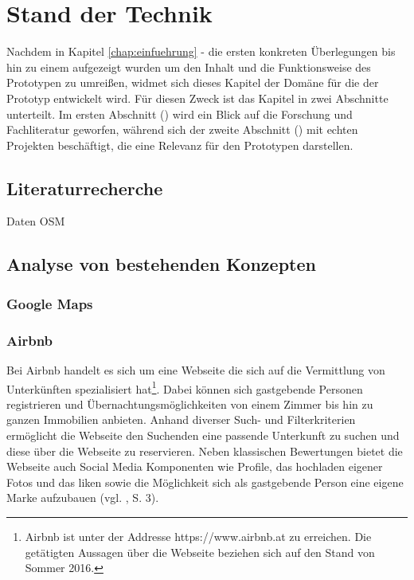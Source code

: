 \documentclass[../Bachelorarbeit.tex]{subfiles}
\begin{document}
\chapter{Stand der Technik}
\label{chap:analyse}

Nachdem in Kapitel \ref{chap:einfuehrung} -  die ersten konkreten Überlegungen bis hin zu einem  aufgezeigt wurden um den Inhalt und die Funktionsweise des Prototypen zu umreißen, widmet sich dieses Kapitel der Domäne für die der Prototyp entwickelt wird.
Für diesen Zweck ist das Kapitel in zwei Abschnitte unterteilt. 
Im ersten Abschnitt () wird ein Blick auf die Forschung und Fachliteratur geworfen, während sich der zweite Abschnitt () mit echten Projekten beschäftigt, die eine Relevanz für den Prototypen darstellen.


\section{Literaturrecherche}
\label{chap:analyse:sec:sota}





Daten OSM


\section{Analyse von bestehenden Konzepten}
\label{chap:analyse:sec:analyBestehendeKonz}


\subsection{Google Maps}
\label{chap:analyse:sec:sota:sec:google_maps}


\subsection{Airbnb}
Bei Airbnb handelt es sich um eine Webseite die sich auf die Vermittlung von Unterkünften spezialisiert hat\footnote{
	Airbnb ist unter der Addresse https://www.airbnb.at zu erreichen. Die getätigten Aussagen über die Webseite beziehen sich auf den Stand von Sommer 2016.
	}. 
Dabei können sich gastgebende Personen registrieren und Übernachtungsmöglichkeiten von einem Zimmer bis hin zu ganzen Immobilien anbieten. 
Anhand diverser Such- und Filterkriterien ermöglicht die Webseite den Suchenden eine passende Unterkunft zu suchen und diese über die Webseite zu reservieren.
Neben klassischen Bewertungen bietet die Webseite auch Social Media Komponenten wie Profile, das hochladen eigener Fotos und das liken  sowie die Möglichkeit sich als gastgebende Person eine eigene Marke aufzubauen (vgl. \cite{Yannopoulou2013}, S. 3).
\end{document}
